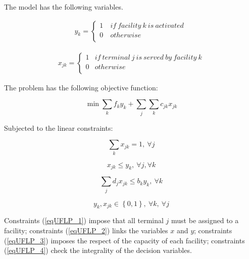 The model has the following variables.

\begin{equation}
   \begin{split}
   y_k=\left\{
                \begin{array}{ll}
                  1\ & if\ facility\ k\ is\ activated\ \\
                  0 & otherwise\\
                \end{array}
              \right.
   \end{split}
\end{equation}

\begin{equation}
   \begin{split}
   x_{jk}=\left\{
                \begin{array}{ll}
                  1 & if\ terminal\ j\ is\ served\ by\ facility\ k\\
                  0 & otherwise\\
                \end{array}
              \right.
   \end{split}
\end{equation}

The problem has the following objective function:

\begin{equation}
    \min{\sum_{k}{f_ky_k+\sum_{j}\sum_{k} c_{jk}}}x_{jk}
\end{equation}

Subjected to the linear constraints:

\begin{equation}
    \sum_{k} x_{jk}=1,\ \forall j
    \label{eqUFLP_1}
\end{equation}

\begin{equation}
    x_{jk}\le y_k,\ \forall j,\forall k
    \label{eqUFLP_2}
\end{equation}

\begin{equation}
    \sum_{j}{d_jx_{jk}\le b_ky_k},\ \forall k
    \label{eqUFLP_3}
\end{equation}

\begin{equation}
    y_k,x_{jk}\in\left\{0,1\right\},\ \forall k,\ \forall j
    \label{eqUFLP_4}
\end{equation}

Constraints (\ref{eqUFLP_1}) impose that all terminal $j$ must be assigned to a facility; constraints (\ref{eqUFLP_2}) links the variables $x$ and $y$; constraints (\ref{eqUFLP_3}) imposes the respect of the capacity of each facility; constraints (\ref{eqUFLP_4}) check the integrality of the decision variables.\par

